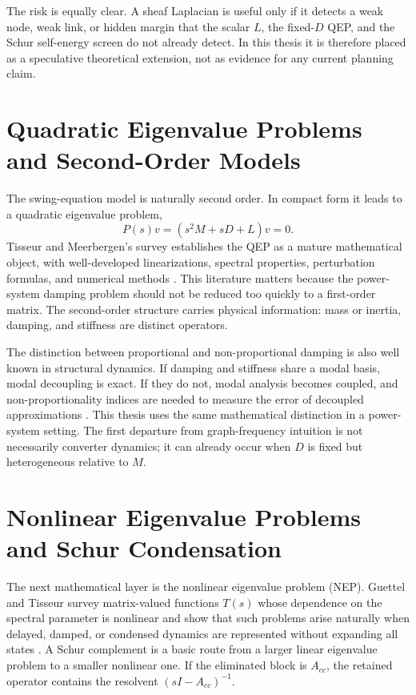The risk is equally clear. A sheaf Laplacian is useful only if it detects a
weak node, weak link, or hidden margin that the scalar \(L\), the fixed-\(D\)
QEP, and the Schur self-energy screen do not already detect. In this thesis it
is therefore placed as a speculative theoretical extension, not as evidence
for any current planning claim.

\section{Quadratic Eigenvalue Problems and Second-Order Models}

The swing-equation model is naturally second order. In compact form it leads to
a quadratic eigenvalue problem,
\begin{equation}
  P(s)v=(s^2M+sD+L)v=0.
  \label{eq:lit_qep}
\end{equation}
Tisseur and Meerbergen's survey establishes the QEP as a mature mathematical
object, with well-developed linearizations, spectral properties, perturbation
formulas, and numerical methods \cite{tisseur2001qep}. This literature matters
because the power-system damping problem should not be reduced too quickly to a
first-order matrix. The second-order structure carries physical information:
mass or inertia, damping, and stiffness are distinct operators.

The distinction between proportional and non-proportional damping is also
well known in structural dynamics. If damping and stiffness share a modal
basis, modal decoupling is exact. If they do not, modal analysis becomes
coupled, and non-proportionality indices are needed to measure the error of
decoupled approximations \cite{conde2021nonproportionality}. This thesis uses
the same mathematical distinction in a power-system setting. The first
departure from graph-frequency intuition is not necessarily converter
dynamics; it can already occur when \(D\) is fixed but heterogeneous relative
to \(M\).

\section{Nonlinear Eigenvalue Problems and Schur Condensation}

The next mathematical layer is the nonlinear eigenvalue problem (NEP). Guettel
and Tisseur survey matrix-valued functions \(T(s)\) whose dependence on the
spectral parameter is nonlinear and show that such problems arise naturally
when delayed, damped, or condensed dynamics are represented without expanding
all states \cite{guettel2017nep}. A Schur complement is a basic route from a
larger linear eigenvalue problem to a smaller nonlinear one. If the eliminated
block is \(A_{cc}\), the retained operator contains the resolvent
\((sI-A_{cc})^{-1}\).

